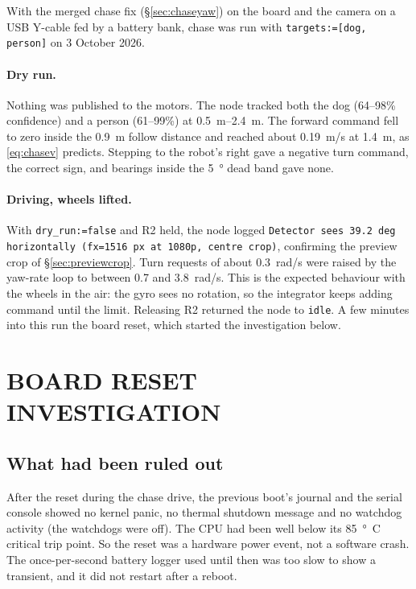 With the merged chase fix (\S\ref{sec:chaseyaw}) on the board and the camera
on a USB Y-cable fed by a battery bank, chase was run with
\texttt{targets:=[dog, person]} on 3 October 2026.

\paragraph{Dry run.} Nothing was published to the motors. The node tracked
both the dog (64--98\% confidence) and a person (61--99\%) at
\SIrange{0.5}{2.4}{m}. The forward command fell to zero inside the
\SI{0.9}{m} follow distance and reached about \SI{0.19}{m/s} at
\SI{1.4}{m}, as \eqref{eq:chasev} predicts. Stepping to the robot's right
gave a negative turn command, the correct sign, and bearings inside the
\SI{5}{\degree} dead band gave none.

\paragraph{Driving, wheels lifted.} With \texttt{dry\_run:=false} and R2 held,
the node logged \texttt{Detector sees 39.2 deg horizontally (fx=1516 px at
1080p, centre crop)}, confirming the preview crop of
\S\ref{sec:previewcrop}. Turn requests of about \SI{0.3}{rad/s} were raised
by the yaw-rate loop to between 0.7 and \SI{3.8}{rad/s}. This is the
expected behaviour with the wheels in the air: the gyro sees no rotation,
so the integrator keeps adding command until the limit. Releasing R2 returned the node to
\texttt{idle}. A few minutes into this run the
board reset, which started the investigation below.

\section{BOARD RESET INVESTIGATION}
\label{sec:resettests}

\subsection{What had been ruled out}

After the reset during the chase drive, the previous boot's journal and the
serial console showed no kernel panic, no thermal shutdown message and no
watchdog activity (the watchdogs were off). The CPU had been well below its
\SI{85}{\degree C} critical trip point. So the reset was a hardware power
event, not a software crash. The once-per-second battery logger used until
then was too slow to show a transient, and it did not restart after a
reboot.

